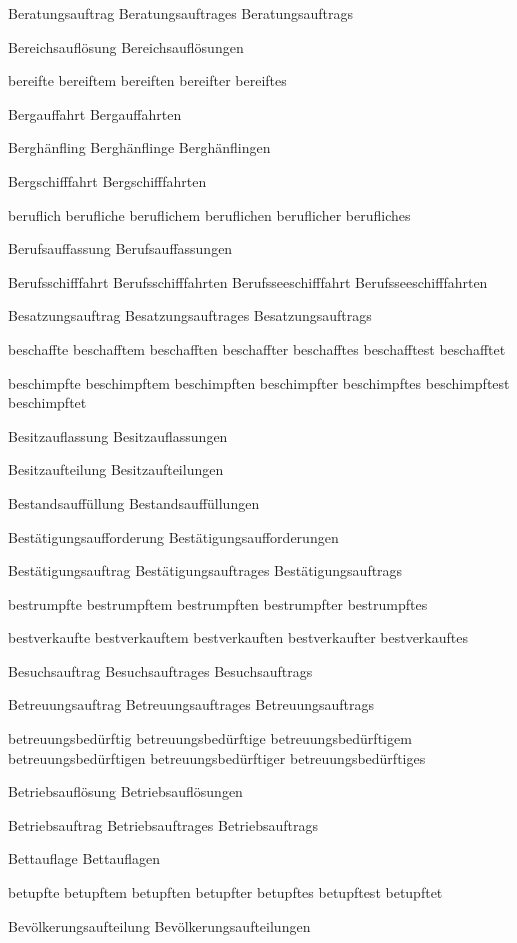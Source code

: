Beratungsauftrag
Beratungsauftrages
Beratungsauftrags

Bereichsauflösung
Bereichsauflösungen

bereifte
bereiftem
bereiften
bereifter
bereiftes

Bergauffahrt
Bergauffahrten

Berghänfling
Berghänflinge
Berghänflingen

Bergschifffahrt
Bergschifffahrten

beruflich
berufliche
beruflichem
beruflichen
beruflicher
berufliches

Berufsauffassung
Berufsauffassungen

Berufsschifffahrt
Berufsschifffahrten
Berufsseeschifffahrt
Berufsseeschifffahrten

Besatzungsauftrag
Besatzungsauftrages
Besatzungsauftrags

beschaffte
beschafftem
beschafften
beschaffter
beschafftes
beschafftest
beschafftet

beschimpfte
beschimpftem
beschimpften
beschimpfter
beschimpftes
beschimpftest
beschimpftet

Besitzauflassung
Besitzauflassungen

Besitzaufteilung
Besitzaufteilungen

Bestandsauffüllung
Bestandsauffüllungen

Bestätigungsaufforderung
Bestätigungsaufforderungen

Bestätigungsauftrag
Bestätigungsauftrages
Bestätigungsauftrags

bestrumpfte
bestrumpftem
bestrumpften
bestrumpfter
bestrumpftes

bestverkaufte
bestverkauftem
bestverkauften
bestverkaufter
bestverkauftes

Besuchsauftrag
Besuchsauftrages
Besuchsauftrags

Betreuungsauftrag
Betreuungsauftrages
Betreuungsauftrags

betreuungsbedürftig
betreuungsbedürftige
betreuungsbedürftigem
betreuungsbedürftigen
betreuungsbedürftiger
betreuungsbedürftiges

Betriebsauflösung
Betriebsauflösungen

Betriebsauftrag
Betriebsauftrages
Betriebsauftrags

Bettauflage
Bettauflagen

betupfte
betupftem
betupften
betupfter
betupftes
betupftest
betupftet

Bevölkerungsaufteilung
Bevölkerungsaufteilungen

